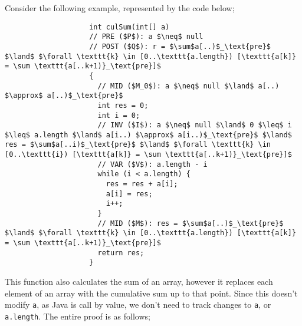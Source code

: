 \documentclass[a4paper, 12pt]{article}
\begin{document}
                Consider the following example, represented by the code below;
                \begin{lstlisting}
                    int culSum(int[] a)
                    // PRE ($P$): a $\neq$ null
                    // POST ($Q$): r = $\sum$a[..)$_\text{pre}$ $\land$ $\forall \texttt{k} \in [0..\texttt{a.length}) [\texttt{a[k]} = \sum \texttt{a[..k+1)}_\text{pre}]$
                    {
                      // MID ($M_0$): a $\neq$ null $\land$ a[..) $\approx$ a[..)$_\text{pre}$
                      int res = 0;
                      int i = 0;
                      // INV ($I$): a $\neq$ null $\land$ 0 $\leq$ i $\leq$ a.length $\land$ a[i..) $\approx$ a[i..)$_\text{pre}$ $\land$ res = $\sum$a[..i)$_\text{pre}$ $\land$ $\forall \texttt{k} \in [0..\texttt{i}) [\texttt{a[k]} = \sum \texttt{a[..k+1)}_\text{pre}]$
                      // VAR ($V$): a.length - i
                      while (i < a.length) {
                        res = res + a[i];
                        a[i] = res;
                        i++;
                      }
                      // MID ($M$): res = $\sum$a[..)$_\text{pre}$ $\land$ $\forall \texttt{k} \in [0..\texttt{a.length}) [\texttt{a[k]} = \sum \texttt{a[..k+1)}_\text{pre}]$
                      return res;
                    }
                \end{lstlisting}
                This function also calculates the sum of an array, however it replaces each element of an array with the cumulative sum up to that point. Since this doesn't modify \texttt{a}, as Java is call by value, we don't need to track changes to \texttt{a}, or \texttt{a.length}. The entire proof is as follows;
\end{document}
